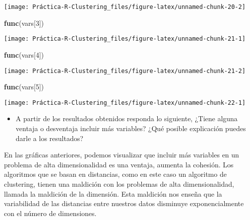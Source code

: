 \documentclass[
]{article}
\newenvironment{Shaded}{\begin{snugshade}}{\end{snugshade}}
\newcommand{\DecValTok}[1]{\textcolor[rgb]{0.00,0.00,0.81}{#1}}
\newcommand{\KeywordTok}[1]{\textcolor[rgb]{0.13,0.29,0.53}{\textbf{#1}}}
\newcommand{\NormalTok}[1]{#1}
\providecommand{\tightlist}{%
  \setlength{\itemsep}{0pt}\setlength{\parskip}{0pt}}
\begin{document}
\begin{center}\texttt{[image: Práctica-R-Clustering\_files/figure-latex/unnamed-chunk-20-2]} \end{center}

\newpage

\begin{Shaded}
\begin{Highlighting}[]
\KeywordTok{func}\NormalTok{(vars[}\DecValTok{3}\NormalTok{])}
\end{Highlighting}
\end{Shaded}

\begin{center}\texttt{[image: Práctica-R-Clustering\_files/figure-latex/unnamed-chunk-21-1]} \end{center}

\begin{Shaded}
\begin{Highlighting}[]
\KeywordTok{func}\NormalTok{(vars[}\DecValTok{4}\NormalTok{])}
\end{Highlighting}
\end{Shaded}

\begin{center}\texttt{[image: Práctica-R-Clustering\_files/figure-latex/unnamed-chunk-21-2]} \end{center}

\newpage

\begin{Shaded}
\begin{Highlighting}[]
\KeywordTok{func}\NormalTok{(vars[}\DecValTok{5}\NormalTok{])}
\end{Highlighting}
\end{Shaded}

\begin{center}\texttt{[image: Práctica-R-Clustering\_files/figure-latex/unnamed-chunk-22-1]} \end{center}

\begin{itemize}
\tightlist
\item
  A partir de los resultados obtenidos responda lo siguiente, ¿Tiene
  alguna ventaja o desventaja incluir más variables? ¿Qué posible
  explicación puedes darle a los resultados?
\end{itemize}

En las gráficas anteriores, podemos visualizar que incluir más variables
en un problema de alta dimensionalidad es una ventaja, aumenta la
cohesión. Los algoritmos que se basan en distancias, como en este caso
un algoritmo de clustering, tienen una maldición con los problemas de
alta dimensionalidad, llamada la maldición de la dimensión. Esta
maldición nos enseña que la variabilidad de las distancias entre
nuestros datos disminuye exponencialmente con el número de dimensiones.
\end{document}
